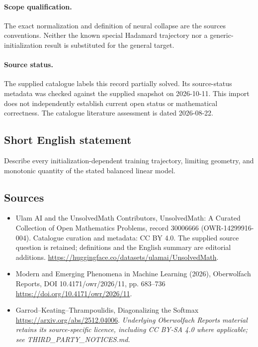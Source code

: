 \documentclass[11pt]{article}
\begin{document}
\paragraph{Scope qualification.}
The exact normalization and definition of neural collapse are the source\textquotesingle s conventions. Neither the known special Hadamard trajectory nor a generic-initialization result is substituted for the general target.
\paragraph{Source status.}
The supplied catalogue labels this record partially solved. Its source-status metadata was checked against the supplied snapshot on 2026-10-11. This import does not independently establish current open status or mathematical correctness. The catalogue literature assessment is dated 2026-08-22.
\subsection{Short English statement}
Describe every initialization-dependent training trajectory, limiting geometry, and monotonic quantity of the stated balanced linear model.
\subsection{Sources}
\begin{itemize}
\item[\hypertarget{source:30006666:1}{S1}] Ulam AI and the UnsolvedMath Contributors, UnsolvedMath: A Curated Collection of Open Mathematics Problems, record 30006666 (OWR-14299916-004). Catalogue curation and metadata: CC BY 4.0. The supplied source question is retained; definitions and the English summary are editorial additions.
\url{https://huggingface.co/datasets/ulamai/UnsolvedMath}.
\item[\hypertarget{source:30006666:2}{S2}] Modern and Emerging Phenomena in Machine Learning (2026), Oberwolfach Reports, DOI 10.4171/owr/2026/11, pp. 683--736
\url{https://doi.org/10.4171/owr/2026/11}.
\item[\hypertarget{source:30006666:3}{S3}] Garrod--Keating--Thrampoulidis, Diagonalizing the Softmax
\url{https://arxiv.org/abs/2512.04006}.
\textit{Underlying Oberwolfach Reports material retains its source-specific licence, including CC BY-SA 4.0 where applicable; see THIRD\_PARTY\_NOTICES.md.}
\end{itemize}
\end{document}
